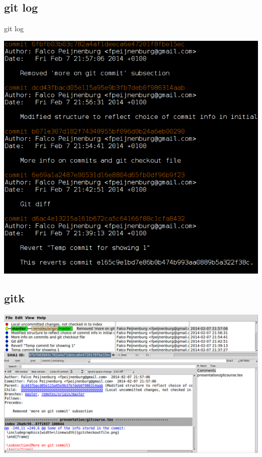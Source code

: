 \documentclass[10pt,a4paper]{beamer}
\begin{document}
\subsection{git log}
\begin{frame}
git log \centerline{\includegraphics[width=\textheight]{gitlog.png}}
\end{frame}

\subsection{gitk}
\begin{frame}
\includegraphics[width=\linewidth]{gitk.png}
\end{frame}
\end{document}
